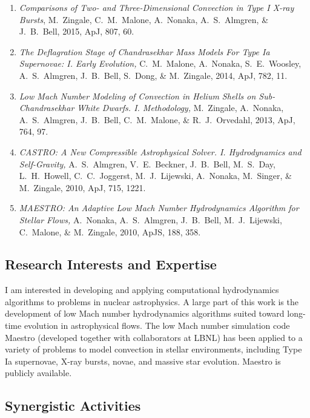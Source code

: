 \documentclass[11pt,letterpaper,english]{article}
\begin{document}
\begin{enumerate} \itemsep1pt \parskip0pt 
\item {\it Comparisons of Two- and Three-Dimensional Convection in
  Type I X-ray Bursts},
  M.~Zingale, C.~M.~Malone, A.~Nonaka, A.~S.~Almgren, \& J.~B.~Bell,
  2015, ApJ, 807, 60.

\item {\it The Deflagration Stage of Chandrasekhar Mass Models For
  Type Ia Supernovae: I. Early Evolution, } C.~M.~Malone, A.~Nonaka,
  S.~E.~Woosley, A.~S.~Almgren, J.~B.~Bell, S.~Dong, \& M.~Zingale,
  2014, ApJ, 782, 11.

\item {\it Low Mach Number Modeling of Convection in Helium Shells on
  Sub-Chandrasekhar White Dwarfs. I. Methodology,} M.~Zingale,
  A.~Nonaka, A.~S.~Almgren, J.~B.~Bell, C.~M.~Malone, \&
  R.~J.~Orvedahl, 2013, ApJ, 764, 97.

\item {\it CASTRO: A New Compressible Astrophysical
  Solver. I. Hydrodynamics and Self-Gravity,} A.~S.~Almgren,
  V.~E.~Beckner, J.~B.~Bell, M.~S.~Day, L.~H.~Howell, C.~C.~Joggerst,
  M.~J.~Lijewski, A.~Nonaka, M.~Singer, \& M.~Zingale, 2010, ApJ, 715,
  1221.

\item {\it MAESTRO: An Adaptive Low Mach Number Hydrodynamics
  Algorithm for Stellar Flows,} A.~Nonaka, A.~S.~Almgren, J.~B.~Bell,
  M.~J.~Lijewski, C.~Malone, \& M.~Zingale, 2010, ApJS, 188, 358.

\end{enumerate}


\subsection*{Research Interests and Expertise}

I am interested in developing and applying computational hydrodynamics
algorithms to problems in nuclear astrophysics.  A large part of this
work is the development of low Mach number hydrodynamics algorithms
suited toward long-time evolution in astrophysical flows.  The low
Mach number simulation code Maestro (developed together with
collaborators at LBNL) has been applied to a variety of problems to
model convection in stellar environments, including Type Ia
supernovae, X-ray bursts, novae, and massive star evolution.  Maestro
is publicly available.



\subsection*{Synergistic Activities}
\end{document}
